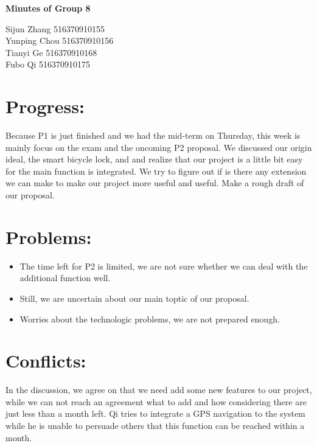 \documentclass[12pt]{article}
\begin{document}
    \begin{center}
        \Huge{\textbf{Minutes of Group 8}}\\
        \vspace{1ex}
        \begin{normalsize}
            Sijun Zhang 516370910155\\
            Yunping Chou 516370910156\\
            Tianyi Ge 516370910168\\
            Fubo Qi 516370910175\\
        \end{normalsize}        
    \end{center}
    \section{Progress:}
    Because P1 is just finished and we had the mid-term on Thursday, this week is
    mainly focus on the exam and the oncoming P2 proposal. We discussed our origin ideal, the  smart 
    bicycle lock, and and realize that our project is a little bit easy for the main function is integrated.
    We try to figure out if is there any extension we can make to make our project more useful and useful. 
    Make a rough draft of our proposal.
    \section{Problems:}
    \begin{itemize}
        \item The time left for P2 is limited, we are not sure whether we can deal with
        the additional function well. 
        \item Still, we are uncertain about our main toptic of our proposal.
        \item Worries about the technologic problems, we are not prepared enough.
    \end{itemize}
    \section{Conflicts:}
        In the discussion, we agree on that we need add some new features to our project,
        while we can not reach an agreement what to add and how considering there are just
        less than a month left. Qi tries to integrate a GPS navigation to the system while 
        he is unable to persuade others that this function can be reached within a month.
\end{document}
